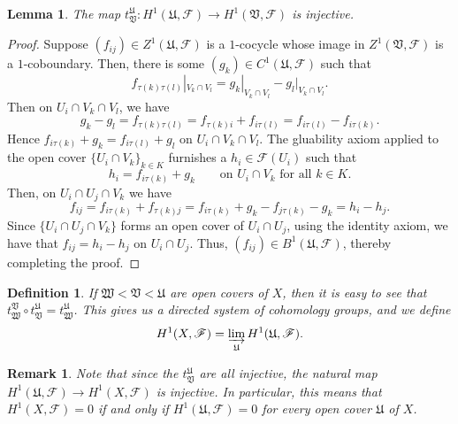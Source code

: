 \documentclass[10pt]{article}
\theoremstyle{thmstyle}
\newtheorem{lemma}[theorem]{Lemma}
\theoremstyle{defstyle}
\newtheorem{definition}[theorem]{Definition}
\newtheorem{remark}[theorem]{Remark}
\newcommand{\frakU}{\mathfrak{U}}
\newcommand{\frakV}{\mathfrak{V}}
\newcommand{\frakW}{\mathfrak{W}}
\newcommand{\scrF}{\mathscr{F}}
\begin{document}
\begin{lemma}
    The map $t^{\frakU}_{\frakV}: H^1(\frakU,\scrF)\to H^1(\frakV,\scrF)$ is injective.
\end{lemma}
\begin{proof}
    Suppose $(f_{ij})\in Z^1(\frakU,\scrF)$ is a $1$-cocycle whose image in $Z^1(\frakV,\scrF)$ is a $1$-coboundary. Then, there is some $(g_k)\in C^1(\frakU,\scrF)$ such that 
    \begin{equation*}
        f_{\tau(k)\tau(l)}|_{V_k\cap V_l} = g_k|_{V_k\cap V_l} - g_l|_{V_k\cap V_l}.
    \end{equation*}
    Then on $U_i\cap V_k\cap V_l$, we have 
    \begin{equation*}
        g_k - g_l = f_{\tau(k)\tau(l)} = f_{\tau(k)i} + f_{i\tau(l)} = f_{i\tau(l)} - f_{i\tau(k)}.
    \end{equation*}
    Hence $f_{i\tau(k)} + g_k = f_{i\tau(l)} + g_l$ on $U_i\cap V_k\cap V_l$. The gluability axiom applied to the open cover $\{U_i\cap V_k\}_{k\in K}$ furnishes a $h_i\in\scrF(U_i)$ such that 
    \begin{equation*}
        h_i = f_{i\tau(k)} + g_k\qquad\text{on } U_i\cap V_k\text{ for all }k\in K.
    \end{equation*}
    Then, on $U_i\cap U_j\cap V_k$ we have 
    \begin{equation*}
        f_{ij} = f_{i\tau(k)} + f_{\tau(k)j} = f_{i\tau(k)} + g_k - f_{j\tau(k)} - g_k = h_i - h_j.
    \end{equation*}
    Since $\{U_i\cap U_j\cap V_k\}$ forms an open cover of $U_i\cap U_j$, using the identity axiom, we have that $f_{ij} = h_i - h_j$ on $U_i\cap U_j$. Thus, $(f_{ij})\in B^1(\frakU,\scrF)$, thereby completing the proof.
\end{proof}

\begin{definition}
    If $\frakW < \frakV < \frakU$ are open covers of $X$, then it is easy to see that $t^{\frakV}_{\frakW}\circ t^{\frakU}_{\frakV} = t^{\frakU}_{\frakW}$. This gives us a directed system of cohomology groups, and we define 
    \begin{equation*}
        H^1(X,\scrF) = \varinjlim_{\frakU} H^1(\frakU,\scrF).
    \end{equation*}
\end{definition}
\begin{remark}
    Note that since the $t^{\frakU}_{\frakV}$ are all injective, the natural map $H^1(\frakU,\scrF)\to H^1(X,\scrF)$ is injective. In particular, this means that $H^1(X,\scrF) = 0$ if and only if $H^1(\frakU,\scrF) = 0$ for every open cover $\frakU$ of $X$.
\end{remark}
\end{document}
